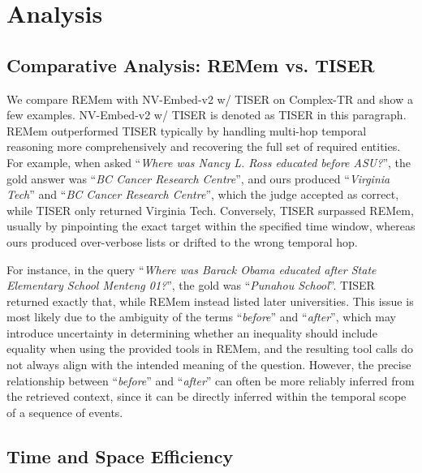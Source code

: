 \documentclass{article} %
\newcommand{\ours}{REMem\xspace}
\begin{document}
\section{Analysis}



\subsection{Comparative Analysis: \ours vs. TISER}
\label{subsec:case studies}

We compare \ours with NV-Embed-v2 w/ TISER \citep{tiser} on Complex-TR and show a few examples. NV-Embed-v2 w/ TISER is denoted as TISER in this paragraph.
\ours outperformed TISER typically by handling multi-hop temporal reasoning more comprehensively and recovering the full set of required entities. For example, when asked ``\textit{Where was Nancy L. Ross educated before ASU?}'', the gold answer was ``\textit{BC Cancer Research Centre}'', and ours produced ``\textit{Virginia Tech}'' and ``\textit{BC Cancer Research Centre}'', which the judge accepted as correct, while TISER only returned Virginia Tech. 
Conversely, TISER surpassed \ours, usually by pinpointing the exact target within the specified time window, whereas ours produced over-verbose lists or drifted to the wrong temporal hop. 

For instance, in the query ``\textit{Where was Barack Obama educated after State Elementary School Menteng 01?}'', the gold was ``\textit{Punahou School}''. TISER returned exactly that, while \ours instead listed later universities.
This issue is most likely due to the ambiguity of the terms ``\textit{before}'' and ``\textit{after}'', which may introduce uncertainty in determining whether an inequality should include equality when using the provided tools in \ours, and the resulting tool calls do not always align with the intended meaning of the question.
However, the precise relationship between ``\textit{before}'' and ``\textit{after}'' can often be more reliably inferred from the retrieved context, since it can be directly inferred within the temporal scope of a sequence of events.

\subsection{Time and Space Efficiency}
\label{subsec:efficiency-analysis}

\end{document}
